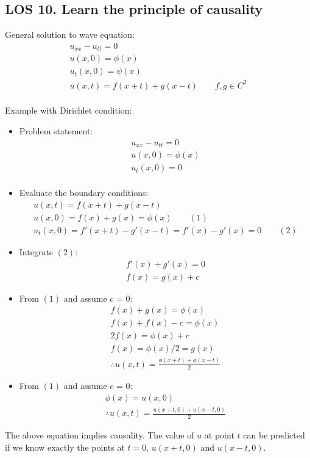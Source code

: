 \documentclass[12pt, a4paper]{article}
\begin{document}
\subsection*{LOS 10. Learn the principle of causality}
General solution to wave equation:
\begin{gather*}
    u_{xx} - u_{tt} = 0 \\
    u(x, 0) = \phi(x)\\
    u_t(x,0) = \psi(x)\\
    u(x, t) = f(x+t) + g(x-t) \qquad f, g \in C^2
\end{gather*} \\
Example with Dirichlet condition:
\begin{itemize}
    \item Problem statement:
    \begin{gather*}
        u_{xx} - u_{tt} = 0 \\
        u(x, 0) = \phi(x)\\
        u_t(x,0) = 0\\
    \end{gather*}
    \item Evaluate the boundary conditions:
    \begin{gather*}
        u(x, t) = f(x+t) + g(x-t) \\
        u(x, 0) = f(x) + g(x) = \phi(x)\qquad (1)\\
        u_t(x, 0) = f'(x+t) - g'(x-t) = f'(x) - g'(x) =0 \qquad (2)
    \end{gather*}
    \item Integrate $(2)$:
    \begin{gather*}
        f'(x) + g'(x) = 0 \\
        f(x) = g(x) + c
    \end{gather*}
    \item From $(1)$ and assume $c$ = 0:
    \begin{gather*}
        f(x) + g(x) = \phi(x) \\
        f(x) + f(x) - c = \phi(x)\\
        2f(x) = \phi(x) + c \\
        f(x) = \phi(x)/2 = g(x) \\
        \therefore u(x,t) = \frac{\phi(x+t) + \phi(x-t)}{2}
    \end{gather*}
    \item From $(1)$ and assume $c$ = 0:
    \begin{gather*}
        \phi(x) = u(x, 0) \\
        \therefore u(x,t) = \frac{u(x+t, 0) + u(x-t, 0)}{2}
    \end{gather*}
\end{itemize}
The above equation implies causality. The value of $u$ at point $t$ can be predicted if we know exactly the points at $t=0$, $u(x+t, 0)$ and $u(x-t, 0)$.
\end{document}
